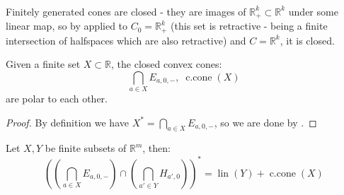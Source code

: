 \paragraph{}Finitely generated cones are closed - they are images of $\mathbb{R}_+^k\subset \mathbb{R}^k$ under some linear map, so by  applied to $C_0=\mathbb{R}_+^k$ (this set is retractive - being a finite intersection of halfspaces which are also retractive) and $C=\mathbb{R}^k$, it is closed.

\begin{prop}\label{prop:017-farkas}
	Given a finite set $X\subset \mathbb{R}$, the closed convex cones:
	\[
		\bigcap_{a\in X}E_{a,0,-},\;\operatorname{c.cone}(X)
	\]
	are polar to each other.
\end{prop}

\begin{proof}
	By definition we have $X^\ast=\bigcap_{a\in X}E_{a,0,-}$, so we are done by .
\end{proof}

\begin{exmp}
	Let $X,Y$ be finite subsets of $\mathbb{R}^m$, then:
	\[
		\left(\left(\bigcap_{a\in X}E_{a,0,-}\right)\cap \left(\bigcap_{a'\in Y}H_{a',0}\right)\right)^\ast
		=\operatorname{lin}(Y)+\operatorname{c.cone}(X)
	\]
\end{exmp}

